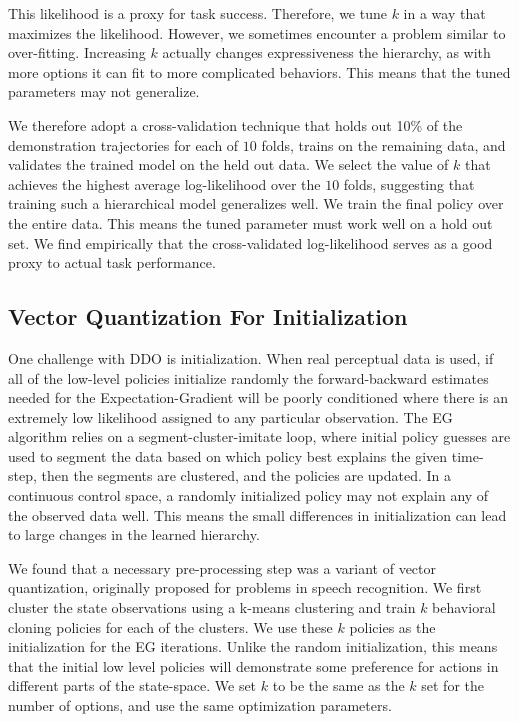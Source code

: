 This likelihood is a proxy for task success.
Therefore, we tune $k$ in a way that maximizes the likelihood.
However, we sometimes encounter a problem similar to over-fitting.
Increasing $k$ actually changes expressiveness the hierarchy, as with more options it can fit to more complicated behaviors.
This means that the tuned parameters may not generalize.

We therefore adopt a cross-validation technique that holds out 10\% of the demonstration trajectories for each of $10$ folds, trains on the remaining data, and validates the trained model on the held out data.
We select the value of $k$ that achieves the highest average log-likelihood over the $10$ folds, suggesting that training such a hierarchical model generalizes well.
We train the final policy over the entire data.
This means the tuned parameter must work well on a hold out set.
We find empirically that the cross-validated log-likelihood serves as a good proxy to actual task performance.

\subsection*{Vector Quantization For Initialization}
One challenge with DDO is initialization.
When real perceptual data is used, if all of the low-level policies initialize randomly the forward-backward estimates needed for the Expectation-Gradient will be poorly conditioned where there is an extremely low likelihood assigned to any particular observation.
The EG algorithm relies on a segment-cluster-imitate loop, where initial policy guesses are used to segment the data based on which policy best explains the given time-step, then the segments are clustered, and the policies are updated.
In a continuous control space, a randomly initialized policy may not explain any of the observed data well.
This means the small differences in initialization can lead to large changes in the learned hierarchy.

We found that a necessary pre-processing step was a variant of vector quantization, originally proposed for problems in speech recognition. 
We first cluster the state observations using a \textsf{k-means} clustering and train $k$ behavioral cloning policies for each of the clusters.
We use these $k$ policies as the initialization for the EG iterations.
Unlike the random initialization, this means that the initial low level policies will demonstrate some preference for actions in different parts of the state-space.
We set $k$ to be the same as the $k$ set for the number of options, and use the same optimization parameters.

